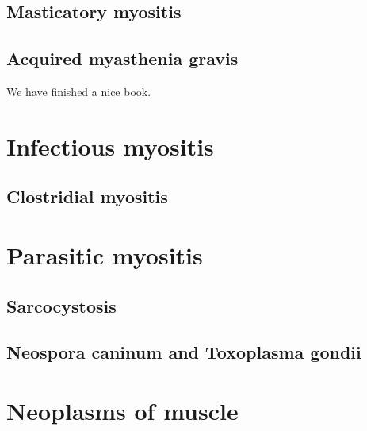\documentclass[openany]{book}
\begin{document}
\section{Masticatory myositis}\label{masticatory-myositis}

\section{Acquired myasthenia gravis}\label{acquired-myasthenia-gravis}

We have finished a nice book.

\chapter{Infectious myositis}\label{infectious-myositis}

\section{Clostridial myositis}\label{clostridial-myositis}

\section{}\label{section}

\chapter{Parasitic myositis}\label{parasitic-myositis}

\section{Sarcocystosis}\label{sarcocystosis}

\section{Neospora caninum and Toxoplasma
gondii}\label{neospora-caninum-and-toxoplasma-gondii}

\section{}\label{section-1}

\chapter{Neoplasms of muscle}\label{neoplasms-of-muscle}
\end{document}
